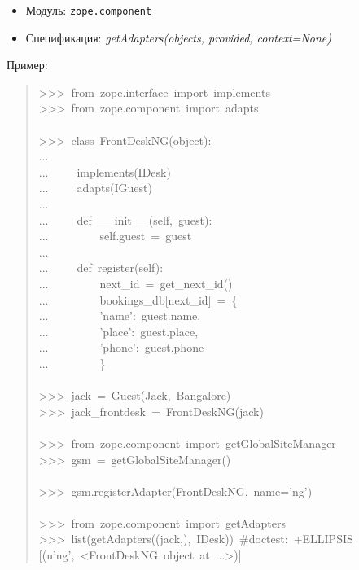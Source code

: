\documentclass[a4paper,openany,twoside,final]{book}
\providecommand*{\DUroletitlereference}[1]{\textsl{#1}}
\begin{document}
\begin{itemize}

\item Модуль: \texttt{zope.component}

\item Спецификация: \DUroletitlereference{getAdapters(objects, provided, context=None)}

\end{itemize}

Пример:

\begin{quote}{\ttfamily \raggedright \noindent
>{}>{}>~from~zope.interface~import~implements\\
>{}>{}>~from~zope.component~import~adapts\\
~\\
>{}>{}>~class~FrontDeskNG(object):\\
...\\
...~~~~~implements(IDesk)\\
...~~~~~adapts(IGuest)\\
...\\
...~~~~~def~\_\_init\_\_(self,~guest):\\
...~~~~~~~~~self.guest~=~guest\\
...\\
...~~~~~def~register(self):\\
...~~~~~~~~~next\_id~=~get\_next\_id()\\
...~~~~~~~~~bookings\_db{[}next\_id{]}~=~\{\\
...~~~~~~~~~'name':~guest.name,\\
...~~~~~~~~~'place':~guest.place,\\
...~~~~~~~~~'phone':~guest.phone\\
...~~~~~~~~~\}\\
~\\
>{}>{}>~jack~=~Guest(\textquotedbl{}Jack\textquotedbl{},~\textquotedbl{}Bangalore\textquotedbl{})\\
>{}>{}>~jack\_frontdesk~=~FrontDeskNG(jack)\\
~\\
>{}>{}>~from~zope.component~import~getGlobalSiteManager\\
>{}>{}>~gsm~=~getGlobalSiteManager()\\
~\\
>{}>{}>~gsm.registerAdapter(FrontDeskNG,~name='ng')\\
~\\
>{}>{}>~from~zope.component~import~getAdapters\\
>{}>{}>~list(getAdapters((jack,),~IDesk))~\#doctest:~+ELLIPSIS\\
{[}(u'ng',~<FrontDeskNG~object~at~...>){]}
}
\end{quote}
\end{document}

